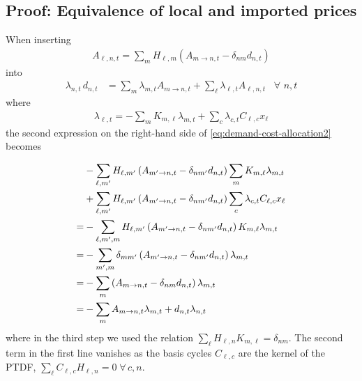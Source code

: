 \documentclass[11pt,twocolumn]{article}
\newcommand{\Forall}[1]{\hspace{10pt} \forall \,\, #1 }
\newcommand{\lmp}[1][n]{\lambda_{#1,t}}
\newcommand{\demand}[1][n]{d_{#1,t}}
\newcommand{\incidence}[1][n]{K_{#1,\ell}}
\newcommand{\ptdf}[1][n]{H_{\ell,#1}}
\newcommand{\cycle}{C_{\ell,c}}
\newcommand{\reactance}{x_\ell}
\newcommand{\cycleprice}{\lambda_{c,t}}
\newcommand{\allocatepeer}[1][m \rightarrow n]{A_{#1,t}}
\newcommand{\allocateflow}[1][n]{A_{\ell,#1,t}}
\begin{document}
\subsection{Proof: Equivalence of local and imported prices}
\label{sec:proof_equivalence}

When inserting 
\begin{align}
    \allocateflow = \sum_m \ptdf[m] (\allocatepeer - \delta_{nm} \demand) 
    \label{eq:allocateflow2}
\end{align}
into 
\begin{align}
    \lmp\, \demand &= \sum_m \lmp[m] \allocatepeer + \sum_\ell \lmp[\ell] \allocateflow \Forall{n,t}
    \label{eq:demand-cost-allocation2}
\end{align}
where 
\begin{align}
    \lmp[\ell] = - \sum_m \incidence[m] \lmp[m]  + \sum_c  \cycleprice \cycle \reactance   
\end{align}
the second expression on the right-hand side of \cref{eq:demand-cost-allocation2} becomes 



\begin{align}
    \notag
    &- \sum_{\ell, m'} \ptdf[m'] \left( \allocatepeer[m' \rightarrow n]  - \delta_{n m'} \demand \right) \sum_m \incidence[m] \lmp[m] \\
    \notag
    &+ \sum_{\ell, m'} \ptdf[m'] \left( \allocatepeer[m' \rightarrow n]  - \delta_{n m'} \demand \right) \sum_c  \cycleprice \cycle \reactance   \\
    \notag
    =& - \sum_{\ell, m', m} \ptdf[m'] \left( \allocatepeer[m' \rightarrow n]  - \delta_{n m'} \demand \right) \incidence[m] \lmp[m] \\
    \notag
    =& - \sum_{m', m} \delta_{m m'} \left( \allocatepeer[m' \rightarrow n]  - \delta_{n m'} \demand \right) \lmp[m] \\
    \notag
    =& - \sum_{m} \left( \allocatepeer - \delta_{n m} \demand \right) \lmp[m] \\
    =& - \sum_{m} \allocatepeer \lmp[m] + \demand \lmp 
\end{align}
where in the third step we used the relation $\sum_\ell \ptdf \incidence[m] = \delta_{n m}$.
The second term in the first line vanishes as the basis cycles $\cycle$ are the kernel of the PTDF, $\sum_{\ell} \cycle \ptdf  = 0 \; \forall\, c, n$. 
\end{document}
